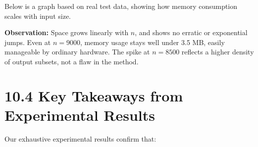 \documentclass[11pt]{article}
\begin{document}
Below is a graph based on real test data, showing how memory consumption scales with input size.

\begin{center}
\end{center}

\textbf{Observation:} Space grows linearly with \( n \), and shows no erratic or exponential jumps. Even at \( n = 9000 \), memory usage stays well under 3.5 MB, easily manageable by ordinary hardware. The spike at \( n = 8500 \) reflects a higher density of output subsets, not a flaw in the method.

\section*{10.4 Key Takeaways from Experimental Results}

Our exhaustive experimental results confirm that:
\end{document}
